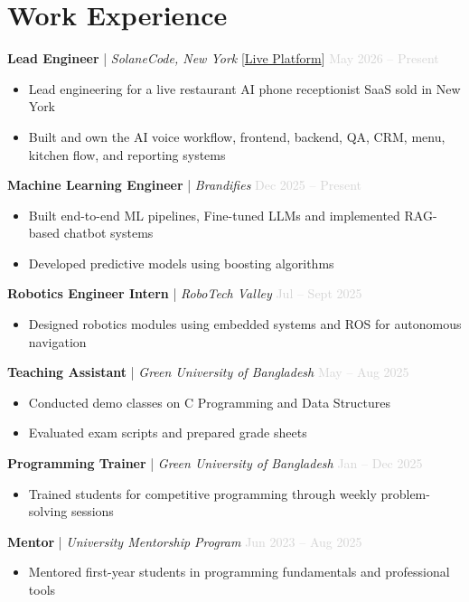 \documentclass[letterpaper,11pt]{extarticle}
\begin{document}
\section{Work Experience}
\vspace{0.2cm}
\textbf{Lead Engineer} | \textit{SolaneCode, New York} \hfill [\href{https://restaurant.sloancode.com/}{Live Platform}] \textcolor{lightgray}{May 2026 -- Present}
\begin{itemize}[noitemsep, topsep=0pt]
    \item Lead engineering for a live restaurant AI phone receptionist SaaS sold in New York
    \item Built and own the AI voice workflow, frontend, backend, QA, CRM, menu, kitchen flow, and reporting systems
\end{itemize}
\vspace{0.2cm}
\textbf{Machine Learning Engineer} | \textit{Brandifies} \hfill \textcolor{lightgray}{Dec 2025 -- Present}
\begin{itemize}[noitemsep, topsep=0pt]
    \item Built end-to-end ML pipelines, Fine-tuned LLMs and implemented RAG-based chatbot systems
    \item Developed predictive models using boosting algorithms
\end{itemize}
\vspace{0.2cm}
\textbf{Robotics Engineer Intern} | \textit{RoboTech Valley} \hfill \textcolor{lightgray}{Jul -- Sept 2025}
\begin{itemize}[noitemsep, topsep=0pt]
    \item Designed robotics modules using embedded systems and ROS for autonomous navigation
\end{itemize}
\vspace{0.2cm}
\textbf{Teaching Assistant} | \textit{Green University of Bangladesh} \hfill \textcolor{lightgray}{May -- Aug 2025}
\begin{itemize}[noitemsep, topsep=0pt]
    \item Conducted demo classes on C Programming and Data Structures
    \item Evaluated exam scripts and prepared grade sheets
\end{itemize}
\vspace{0.2cm}
\textbf{Programming Trainer} | \textit{Green University of Bangladesh} \hfill \textcolor{lightgray}{Jan -- Dec 2025}
\begin{itemize}[noitemsep, topsep=0pt]
    \item Trained students for competitive programming through weekly problem-solving sessions
\end{itemize}
\vspace{0.2cm}
\textbf{Mentor} | \textit{University Mentorship Program} \hfill \textcolor{lightgray}{Jun 2023 -- Aug 2025}
\begin{itemize}[noitemsep, topsep=0pt]
    \item Mentored first-year students in programming fundamentals and professional tools
\end{itemize}
\end{document}
